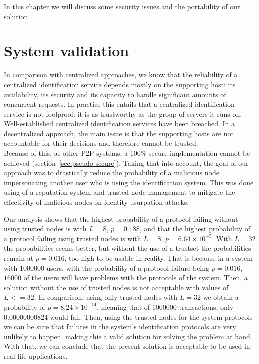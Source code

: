 In this chapter we will discuss some security issues and the portability of our
solution.%

\section{System validation}

In comparison with centralized approaches, we know that the reliability of a
centralized identification service depends mostly on the
supporting host: its availability, its security and its capacity  to handle
significant amounts of concurrent requests. 
In practice this entails that a centralized identification service is not
foolproof: it is as trustworthy as the group of servers it runs on.
Well-established centralized identification services have been breached. %
In a decentralized approach, the main issue is that the supporting hosts are
not accountable for their decisions and therefore cannot be trusted.\\

Because of this, as other P2P systems, a 100\% secure implementation cannot be achieved
(section~\ref{sec:pseudo-secure}).
Taking that into account, the goal of our approach was to drastically reduce the probability of a
malicious node impersonating another user who is using the identification
system. This was done using of a reputation system and trusted node management
to mitigate the effectivity of malicious nodes on identity usurpation attacks.

Our analysis shows that the highest probability of a protocol failing without using trusted nodes is 
with $L=8$, $p = 0.188$, and that the highest probability of a protocol failing
using trusted nodes is with $L=8$, $p = 6.64 \times 10^{-5}$. With $L=32$ the probabilities seems better, but without the use
of a trustset the probabilities remain at $p = 0.016$, too high to be usable in
reality. That is because in a system with $1000000$ users, with the probability
of a protocol failure being $p = 0.016$,  $16000$ of the users will have problems with
the protocols of the system. Then, a solution without the use of trusted nodes
is not acceptable with values of $L <= 32$. In comparison, using
only trusted nodes with $L=32$ we obtain a probability of $p =8.24 \times
10^{-14}$, meaning that of $1000000$ transactions,
only $0.00000000824$ would fail.
Then, using the trusted nodes for the system protocols we can be sure that failures in the
system's identification protocols are very unlikely to happen, making this a valid
solution for solving the problem at hand.
With that, we can conclude that the present solution is acceptable to be
used in real life applications.


